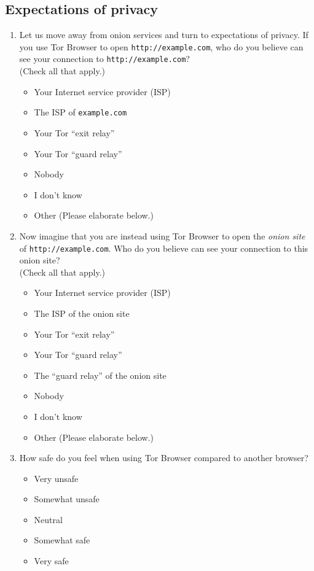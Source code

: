 \subsection{Expectations of privacy}
\begin{enumerate}
    \item Let us move away from onion services and turn to expectations of
        privacy. If you use Tor Browser to open \texttt{http://example.com}, who
        do you believe can see your connection to
        \texttt{http://example.com}?\\(Check all that apply.)
        \begin{itemize}[label=$\Square$]
            \item Your Internet service provider (ISP)
            \item The ISP of \texttt{example.com}
            \item Your Tor ``exit relay''
            \item Your Tor ``guard relay''
            \item Nobody
            \item I don't know
            \item Other (Please elaborate below.)
        \end{itemize}

    \item Now imagine that you are instead using Tor Browser to open the
        \emph{onion site} of \texttt{http://example.com}. Who do you believe can
        see your connection to this onion site?\\(Check all that apply.)
        \begin{itemize}[label=$\Square$]
            \item Your Internet service provider (ISP)
            \item The ISP of the onion site
            \item Your Tor ``exit relay''
            \item Your Tor ``guard relay''
            \item The ``guard relay'' of the onion site
            \item Nobody
            \item I don't know
            \item Other (Please elaborate below.)
        \end{itemize}

    \item How safe do you feel when using Tor Browser compared to another
        browser?
        \begin{itemize}[label=$\Circle$]
            \item Very unsafe
            \item Somewhat unsafe
            \item Neutral
            \item Somewhat safe
            \item Very safe
        \end{itemize}


\end{enumerate}
